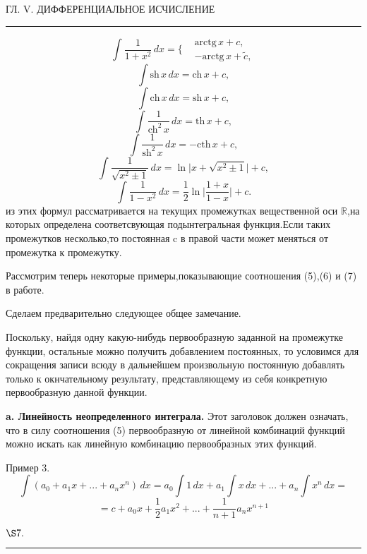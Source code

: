 \documentclass[a5paper,18pt]{book}
\begin{document}
 \begin{center}
     
     ГЛ. V. ДИФФЕРЕНЦИАЛЬНОЕ ИСЧИСЛЕНИЕ
     \par\noindent\rule{\textwidth}{1.1pt} %
     
 \end{center}
  \par  \[\int \frac{1}{1+x^2}\, dx=\bigg\{ 
  \begin{array}{lr}
       & \textrm{arctg}\, x+c, \\
       & -\textrm{arctg}\, x+\tilde{c},
  \end{array}
   \]
 \[\int \textrm{sh}\, x\, dx=\textrm{ch}\, x+c,\]
 \[\int \textrm{ch} \, x\, dx=\textrm{sh}\, x+c,\]
 \[\int \frac{1}{\textrm{ch}^2\, x}\, dx=\textrm{th} \, x+c,\]
 \[\int \frac{1}{\textrm{sh}^2\, x}\, dx=-\textrm{cth} \, x+c,\]
  \[\int \frac{1}{\sqrt{x^2 \pm 1}}\, dx=\ln{\big|x+\sqrt{x^2 \pm 1}\big|}+c,\]
  \[\int \frac{1}{1-x^2 }\, dx=\frac{1}{2}\ln{\big|\frac{1+x}{1-x}\big|}+c.\]
   из этих формул рассматривается на текущих промежутках вещественной оси $\mathbb{R}$,на которых определена соответсвующая подынтегральная функция.Если таких промежутков несколько,то постоянная c в правой части может меняться от промежутка к промежутку.
  \par Рассмотрим теперь некоторые примеры,показывающие соотношения (5),(6) и (7) в работе.
  \par Сделаем предварительно следующее общее замечание.
  \par Поскольку, найдя одну какую-нибудь первообразную заданной на промежутке функции, остальные можно получить добавлением постоянных, то условимся для сокращения записи всюду в дальнейшем произвольную постоянную добавлять только к окнчательному результату, представляющему из себя конкретную первообразную данной функции.
  \par \textbf{a. Линейность неопределенного интеграла.} Этот заголовок должен означать, что в силу соотношения (5) первообразную от линейной комбинаций функций можно искать как линейную комбинацию первообразных этих функций.
  \par Пример 3.
  \[\int(a_0+ a_1 x+...+a_nx^{n})\, dx=a_0\int 1\, dx + a_1\int x\, dx +...+a_n \int x^{n}\, dx =\]
  \[=c+a_0x+\frac{1}{2}a_1x^2+...+\frac{1}{n+1}a_n x^{n+1}\]
  \newpage
  \begin{center}
      $\S7.$ 
      \par\noindent\rule{\textwidth}{1.1pt} %
  \end{center}
\end{document}
